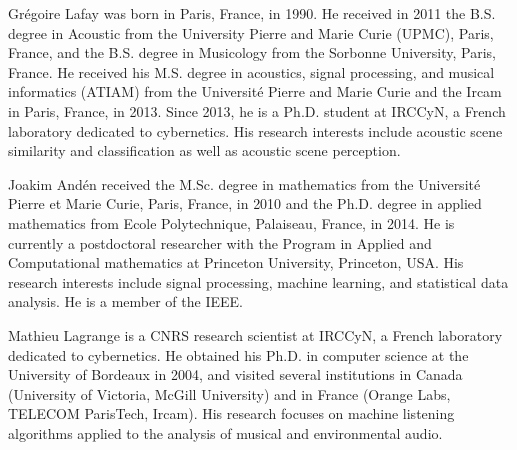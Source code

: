 \documentclass[journal]{IEEEtran}
\begin{document}
\begin{IEEEbiography}{Gr\'egoire Lafay} was born in Paris, France, in 1990. He received in 2011 the B.S. degree in Acoustic from the University Pierre and Marie Curie (UPMC), Paris, France, and the B.S. degree in Musicology from the Sorbonne University, Paris, France. He received his M.S. degree in acoustics, signal processing, and musical informatics (ATIAM) from the Universit\'{e} Pierre and Marie Curie and the Ircam in Paris, France, in 2013. Since 2013, he is a Ph.D. student at IRCCyN, a French laboratory dedicated to cybernetics. His research interests include acoustic scene similarity and classification as well as acoustic scene perception. 
\end{IEEEbiography}


\begin{IEEEbiography}{Joakim And\'en}
received the M.Sc. degree in mathematics from the Universit\'e Pierre et Marie Curie, Paris, France, in 2010 and the Ph.D. degree in applied mathematics from Ecole Polytechnique, Palaiseau, France, in 2014. He is currently a postdoctoral researcher with the Program in Applied and Computational mathematics at Princeton University, Princeton, USA. His research interests include signal processing, machine learning, and statistical data analysis. He is a member of the IEEE.

\end{IEEEbiography}

\begin{IEEEbiography}{Mathieu Lagrange} is a CNRS research scientist at IRCCyN, a French laboratory dedicated to cybernetics. He obtained his Ph.D. in computer science at the University of Bordeaux in 2004, and visited several institutions in Canada (University of Victoria, McGill University) and in France (Orange Labs, TELECOM ParisTech, Ircam). His research focuses on machine listening algorithms applied to the analysis of musical and environmental audio.
\end{IEEEbiography}
\end{document}
